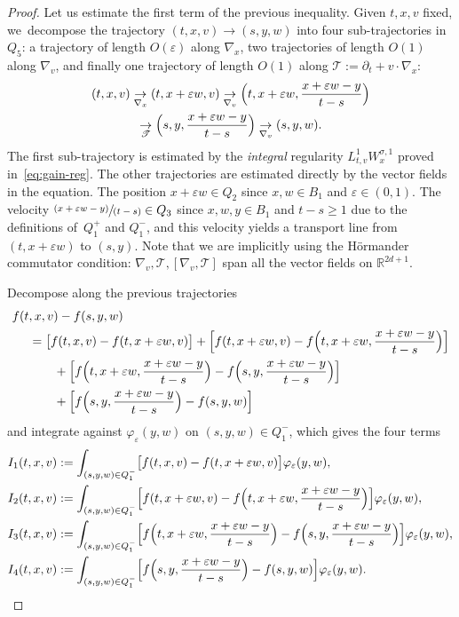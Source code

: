 \documentclass[JEP,XML,SOM,Unicode,NoFloatCountersInSection,published]{cedram}
\let\mathcal\mathscr
\newcommand{\pspfrac}[2]{\sfrac{(#1)}{(#2)}}
\theoremstyle{definition}
\theoremstyle{remark}
\newcommand\R{{\mathbb R}}
\newcommand{\cT}{\mathcal T}
\let\var\varepsilon
\begin{document}
\begin{proof}
Let us estimate the first term of the previous
inequality. Given $t,x,v$ fixed, we~decompose the trajectory
$(t,x,v)\to (s,y,w)$ into four sub-trajectories in
$Q_5$: a trajectory of length $O(\var)$ along $\nabla_x$, two
trajectories of length $O(1)$ along $\nabla_v$, and finally one
trajectory of length $O(1)$ along
$\cT := \partial_t + v \cdot \nabla_x$:
\begin{multline*}
(t,x,v)\underset{\nabla_x}{\to}
(t,x+\varepsilon w,v) \underset{\nabla_v}{\to}
\Bigl(t,x+\varepsilon w, \frac{x+\varepsilon w
-y}{t-s} \Bigr) \\
\underset{\cT}{\to} \Bigl(s,
y,\frac{x+\varepsilon w -y}{t-s} \Bigr)
\underset{\nabla_v}{\to} (s,y,w).
\end{multline*}
The first sub-trajectory is estimated by the {\it integral}
regularity $L^1_{t,v} W^{\sigma,1}_{x}$ proved
in~\eqref{eq:gain-reg}. The other trajectories are estimated
directly by the vector fields in the equation. The position
$x+\varepsilon w \in Q_2$ since $x,w \in B_1$ and
$\var \in (0,1)$. The velocity
$\pspfrac{x+\varepsilon w -y}{t-s} \in Q_3$ since $x,w,y \in B_1$
and $t-s\geq 1$ due to the definitions of~$Q_{1}^+$ and
$Q_{1}^{-}$, and this velocity yields a transport line from
$(t,x+\varepsilon w)$ to $(s,y)$. Note that we are implicitly
using the Hörmander commutator condition:
$\nabla_v,\cT, [\nabla_v,\cT]$ span all the vector fields on
$\R^{2d+1}$.

Decompose along the previous trajectories
\begin{align*}
f(t&,x,v)-f(s,y,w) \\
& = \bigl[ f(t,x,v)-f(t,x+\varepsilon w,v) \bigr] +
\Bigl[ f(t,x+\varepsilon
w,v)- f \Bigl(t,x+\varepsilon w,\frac{x+\varepsilon w -y}{t-s}
\Bigr) \Bigr] \\
& \qquad + \Bigl[ f \Bigl(t,x+\varepsilon w,\frac{x+\varepsilon w
-y}{t-s} \Bigr)- f \Bigl(s,y,\frac{x+\varepsilon w
-y}{t-s} \Bigr) \Bigr] \\
& \qquad + \Bigl[ f \Bigl(s,y,\frac{x+\varepsilon w
-y}{t-s} \Bigr)-f(s,y,w) \Bigr]
\end{align*}
and integrate against $\varphi_\var(y,w)$ on
$(s,y,w)\in Q_{1}^-$, which gives the four terms
\begin{align*}
I_1(t,x,v)
& := \int_{(s,y,w)\in Q_1^{-}}
\bigl[ f(t,x,v)-f(t,x+\varepsilon
w,v)\bigr] \varphi_\var(y,w),\\
I_2(t,x,v)
& := \int_{(s,y,w)\in Q_1^{-}}
\Bigl[ f(t,x+\varepsilon w,v)-f\Bigl(t,x+\varepsilon
w,\frac{x+\varepsilon w -y}{t-s}\Bigr)\Bigr]
\varphi_\var(y,w), \\
I_3(t,x,v)
& := \int_{(s,y,w)\in Q_1^{-}} \Bigl[ f\Bigl(t,x+\varepsilon
w,\frac{x+\varepsilon w
-y}{t-s}\Bigr)-f\Bigl(s,y,\frac{x+\varepsilon w
-y}{t-s}\Bigr)\Bigr] \varphi_\var(y,w), \\
I_4(t,x,v)
& := \int_{(s,y,w)\in Q_1^{-}}
\Bigl[ f\Bigl(s,y,\frac{x+\varepsilon w
-y}{t-s}\Bigr)-f(s,y,w)\Bigr] \varphi_\var(y,w).
\end{align*}


\end{proof}
\end{document}
